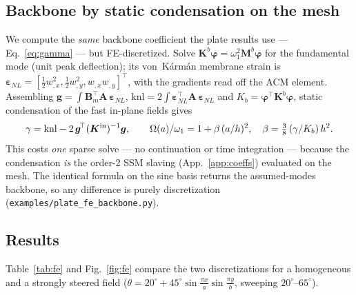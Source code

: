 \subsection{Backbone by static condensation on the mesh}
We compute the \emph{same} backbone coefficient the plate results use ---
Eq.~\eqref{eq:gamma} --- but FE-discretized. Solve $\bm K^b\bm\varphi=\omega_1^2\bm M^b\bm\varphi$
for the fundamental mode (unit peak deflection); its von~K\'arm\'an membrane strain is
$\bm\varepsilon_{NL}=[\tfrac12 w_{,x}^2,\tfrac12 w_{,y}^2,w_{,x}w_{,y}]^{\!\top}$, with the
gradients read off the ACM element. Assembling
$\bm g=\!\int\bm B_m^{\!\top}\bm A\,\bm\varepsilon_{NL}$,
$\mathrm{knl}=2\!\int\bm\varepsilon_{NL}^{\!\top}\bm A\,\bm\varepsilon_{NL}$ and
$K_b=\bm\varphi^{\!\top}\bm K^b\bm\varphi$, static condensation of the fast in-plane fields gives
\begin{equation}
\gamma=\mathrm{knl}-2\,\bm g^{\!\top}(\bm K^{\mathrm{in}})^{-1}\bm g,
\qquad
\Omega(a)/\omega_1=1+\beta\,(a/h)^2,\quad \beta=\tfrac38\,(\gamma/K_b)\,h^2 .
\end{equation}
This costs \emph{one} sparse solve --- no continuation or time integration --- because the
condensation \emph{is} the order-2 SSM slaving (App.~\ref{app:coeffs}) evaluated on the mesh.
The identical formula on the sine basis returns the assumed-modes backbone, so any difference
is purely discretization (\texttt{examples/plate\_fe\_backbone.py}).

\subsection{Results}
Table~\ref{tab:fe} and Fig.~\ref{fig:fe} compare the two discretizations for a homogeneous and a strongly steered
field ($\theta=20^\circ+45^\circ\sin\tfrac{\pi x}{a}\sin\tfrac{\pi y}{b}$, sweeping
$20^\circ$--$65^\circ$).

\begin{table}[!tbp]
\centering\footnotesize
{}
\caption{Assumed-modes vs.\ FE backbone (parenthesized: detuning error vs.\ FE). ``$N$
modes'' is the number of transverse modes in total (the $N$ lowest), with $3\times3$
in-plane modes; the design evaluator uses 64 transverse ($m,n\le8$) and $6\times6$ in-plane
modes (Table~\ref{tab:conv}). This test therefore checks the transverse discretization
and the nonlinear FE model on a smooth steered field ($20^\circ$--$65^\circ$); the in-plane
resolution of the actual design is checked separately by the FE evaluation of the
optimized field (ratio $\nFEratio$, Sec.~\ref{sec:confirm}). Homogeneous:
the two agree to $\nFEtabUDagree\%$, validating the FE nonlinear model. Strong steering: the frequency is a
slowly-converging Ritz upper bound ($+\nFEtabFreqErrEight\%$ at $8$ modes, $+\nFEtabFreqErrTwentyFour\%$ at $24$), but the
\emph{normalized detuning} --- the design quantity --- matches FE to $\nFEtabDetErrEight\%$ at $8$ modes and
$\nFEtabDetErrTwentyFour\%$ at $24$.}
\label{tab:fe}
\end{table}

